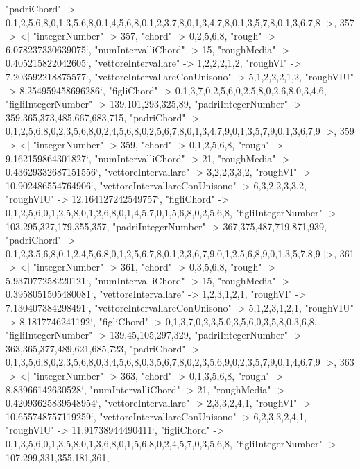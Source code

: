\documentclass[
]{article}
\begin{document}
\begin{DatasetVerbatim}
    "padriChord" -> {{0,1,2,5,6,8},{0,1,3,5,6,8},{0,1,4,5,6,8},{0,1,2,3,7,8},{0,1,3,4,7,8},{0,1,3,5,7,8},{0,1,3,6,7,8}}
  |>,
  357 -> <|
    "integerNumber" -> 357,
    "chord" -> {0,2,5,6,8},
    "rough" -> 6.078237330639075`,
    "numIntervalliChord" -> 15,
    "roughMedia" -> 0.405215822042605`,
    "vettoreIntervallare" -> {1,2,2,2,1,2},
    "roughVI" -> 7.203592218875577`,
    "vettoreIntervallareConUnisono" -> {5,1,2,2,2,1,2},
    "roughVIU" -> 8.254959458696286`,
    "figliChord" -> {{0,1,3,7},{0,2,5,6},{0,2,5,8},{0,2,6,8},{0,3,4,6}},
    "figliIntegerNumber" -> {139,101,293,325,89},
    "padriIntegerNumber" -> {359,365,373,485,667,683,715},
    "padriChord" -> {{0,1,2,5,6,8},{0,2,3,5,6,8},{0,2,4,5,6,8},{0,2,5,6,7,8},{0,1,3,4,7,9},{0,1,3,5,7,9},{0,1,3,6,7,9}}
  |>,
  359 -> <|
    "integerNumber" -> 359,
    "chord" -> {0,1,2,5,6,8},
    "rough" -> 9.162159864301827`,
    "numIntervalliChord" -> 21,
    "roughMedia" -> 0.43629332687151556`,
    "vettoreIntervallare" -> {3,2,2,3,3,2},
    "roughVI" -> 10.902486554764906`,
    "vettoreIntervallareConUnisono" -> {6,3,2,2,3,3,2},
    "roughVIU" -> 12.164127242549757`,
    "figliChord" -> {{0,1,2,5,6},{0,1,2,5,8},{0,1,2,6,8},{0,1,4,5,7},{0,1,5,6,8},{0,2,5,6,8}},
    "figliIntegerNumber" -> {103,295,327,179,355,357},
    "padriIntegerNumber" -> {367,375,487,719,871,939},
    "padriChord" -> {{0,1,2,3,5,6,8},{0,1,2,4,5,6,8},{0,1,2,5,6,7,8},{0,1,2,3,6,7,9},{0,1,2,5,6,8,9},{0,1,3,5,7,8,9}}
  |>,
  361 -> <|
    "integerNumber" -> 361,
    "chord" -> {0,3,5,6,8},
    "rough" -> 5.937077258220121`,
    "numIntervalliChord" -> 15,
    "roughMedia" -> 0.3958051505480081`,
    "vettoreIntervallare" -> {1,2,3,1,2,1},
    "roughVI" -> 7.130407384298491`,
    "vettoreIntervallareConUnisono" -> {5,1,2,3,1,2,1},
    "roughVIU" -> 8.1817746241192`,
    "figliChord" -> {{0,1,3,7},{0,2,3,5},{0,3,5,6},{0,3,5,8},{0,3,6,8}},
    "figliIntegerNumber" -> {139,45,105,297,329},
    "padriIntegerNumber" -> {363,365,377,489,621,685,723},
    "padriChord" -> {{0,1,3,5,6,8},{0,2,3,5,6,8},{0,3,4,5,6,8},{0,3,5,6,7,8},{0,2,3,5,6,9},{0,2,3,5,7,9},{0,1,4,6,7,9}}
  |>,
  363 -> <|
    "integerNumber" -> 363,
    "chord" -> {0,1,3,5,6,8},
    "rough" -> 8.83966142630528`,
    "numIntervalliChord" -> 21,
    "roughMedia" -> 0.42093625839548954`,
    "vettoreIntervallare" -> {2,3,3,2,4,1},
    "roughVI" -> 10.655748757119259`,
    "vettoreIntervallareConUnisono" -> {6,2,3,3,2,4,1},
    "roughVIU" -> 11.91738944490411`,
    "figliChord" -> {{0,1,3,5,6},{0,1,3,5,8},{0,1,3,6,8},{0,1,5,6,8},{0,2,4,5,7},{0,3,5,6,8}},
    "figliIntegerNumber" -> {107,299,331,355,181,361},

\end{DatasetVerbatim}
\end{document}
